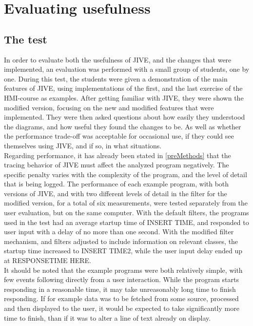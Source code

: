 \chapter{Evaluating usefulness}\label{jiveEval}
\section{The test}\label{jiveEvalTest}
In order to evaluate both the usefulness of JIVE, and the changes that were implemented, an evaluation was performed with a small group of students, one by one.
During this test, the students were given a demonstration of the main features of JIVE, using implementations of the first, and the last exercise of the HMI-course as examples.
After getting familiar with JIVE, they were shown the modified version, focusing on the new and modified features that were implemented.
They were then asked questions about how easily they understood the diagrams, and how useful they found the changes to be.
As well as whether the performance trade-off was acceptable for occasional use, if they could see themselves using JIVE, and if so, in what situations.
~\\

Regarding performance, it has already been stated in \autoref{preMethods} that the tracing behavior of JIVE must affect the analyzed program negatively.
The specific penalty varies with the complexity of the program, and the level of detail that is being logged.
The performance of each example program, with both versions of JIVE, and with two different levels of detail in the filter for the modified version, for a total of six measurements, were tested separately from the user evaluation, but on the same computer.
With the default filters, the programs used in the test had an average startup time of INSERT TIME, and responded to user input with a delay of no more than one second.
With the modified filter mechanism, and filters adjusted to include information on relevant classes, the startup time increased to INSERT TIME2, while the user input delay ended up at RESPONSETIME HERE.
~\\

It should be noted that the example programs were both relatively simple, with few events following directly from a user interaction.
While the program starts responding in a reasonable time, it may take unreasonably long time to finish responding.
If for example data was to be fetched from some source, processed and then displayed to the user, it would be expected to take significantly more time to finish, than if it was to alter a line of text already on display.
~\\


